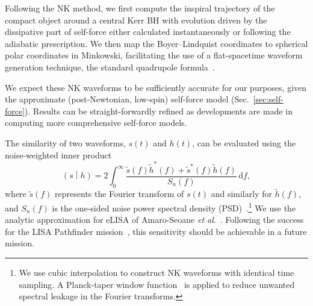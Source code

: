 \documentclass[aps,prd,amsfonts,amssymb,amsmath,nofootinbib,showpacs,superscriptaddress,twocolumn]{revtex4}
\newcommand{\eqnref}[1]{(\ref{eq:#1})}
\newcommand{\secref}[1]{Sec.~\ref{sec:#1}}
\newcommand{\dd}{\ensuremath{\mathrm{d}}}
\newcommand{\intd}[4]{\ensuremath{\int_{#1}^{#2}{#3}\,\dd{#4}}}
\newcommand{\overlap}[2]{\ensuremath{\left(#1\middle|#2\right)}}
\begin{document}
Following the NK method, we first compute the inspiral trajectory of the compact object around a central Kerr BH with evolution driven by the dissipative part of self-force either calculated instantaneously or following the adiabatic prescription. We then map the Boyer--Lindquist coordinates to spherical polar coordinates in Minkowski, facilitating the use of a flat-spacetime waveform generation technique, the standard quadrupole formula~\cite{Misner1973}.

We expect these NK waveforms to be sufficiently accurate for our purposes, given the approximate (post-Newtonian, low-spin) self-force model (\secref{self-force}). Results can be straight-forwardly refined as developments are made in computing more comprehensive self-force models.

The similarity of two waveforms, $s(t)$ and $h(t)$, can be evaluated using the noise-weighted inner product~\cite{Finn1992}
\begin{equation}
\label{eq:innerprod}
\overlap{s}{h} = 2 \intd{0}{\infty}{\frac{\tilde{s}(f)\tilde{h}^*(f)+\tilde{s}^*(f)\tilde{h}(f)}{S_n(f)}}{f},
\end{equation}
where $\tilde{s}(f)$ represents the Fourier transform of $s(t)$ and similarly for $\tilde{h}(f)$, and $S_n(f)$ is the one-sided noise power spectral density (PSD)~\cite{Moore2014a}.\footnote{We use cubic interpolation to construct NK waveforms with identical time sampling. 
A Planck-taper window function~\cite{McKechan2010} is applied to reduce unwanted spectral leakage in the Fourier transforms. 
} We use the analytic approximation for eLISA of Amaro-Seoane {\it{et al}}.~\cite{Amaro-Seoane2012a}. Following the success for the LISA Pathfinder mission~\cite{Armano2016}, this sensitivity should be achievable in a future mission.
\end{document}
